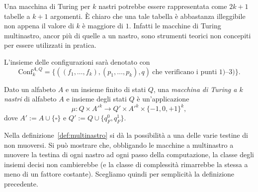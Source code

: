 Una macchina di Turing per $k$ nastri potrebbe essere rappresentata come $2k+1$ tabelle a $k+1$ argomenti. È chiaro che una tale tabella è abbastanza illeggibile non appena il valore di $k$ è maggiore di $1$. Infatti le macchine di Turing multinastro, ancor più di quelle a un nastro, sono strumenti teorici non concepiti per essere utilizzati in pratica.

L'insieme delle configurazioni sarà denotato con
\[
\mathrm{Conf}_k^{A,Q}=\{((f_1,\dots,f_k),(p_1,\dots,p_k),q)\ \text{che verificano i punti 1)--3)}\}.
\]

\begin{defi}\label{def:multinastro}
Dato un alfabeto $A$ e un insieme finito di stati $Q$, una \emph{macchina di Turing a $k$ nastri} di alfabeto $A$ e insieme degli stati $Q$ è un'applicazione
\[
\mu\colon Q\times A'^k\to Q'\times A'^k\times\{-1,0,+1\}^k,
\]
dove $A' := A\cup\{\square\}$ e $Q' := Q\cup\{q_F^0,q_F^1\}$.
\end{defi}

\begin{rema}
    Nella definizione~\ref{def:multinastro} si dà la possibilità a una delle varie testine di non muoversi.
    Si può mostrare che, obbligando le macchine a multinastro a muovere la testina di ogni nastro ad ogni passo della computazione, la classe degli insiemi decisi non cambierebbe (e la classe di complessità rimarrebbe la stessa a meno di un fattore costante).
    Scegliamo quindi per semplicità la definizione precedente.
\end{rema}

